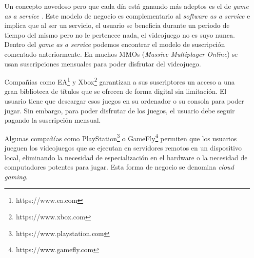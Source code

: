 Un concepto novedoso pero que cada día está ganando más adeptos es el de \textit{game as a service} \cite{11}. Este modelo de negocio es complementario al \textit{software as a service} e implica que al ser un servicio, el usuario se beneficia durante un periodo de tiempo del mismo pero no le pertenece nada, el videojuego no es suyo nunca. Dentro del \textit{game as a service} podemos encontrar el modelo de suscripción comentado anteriormente. En muchos MMOs (\textit{Massive Multiplayer Online}) se usan suscripciones mensuales para poder disfrutar del videojuego.

Compañías como EA\footnote{https://www.ea.com} y Xbox\footnote{https://www.xbox.com} garantizan a sus suscriptores un acceso a una gran biblioteca de títulos que se ofrecen de forma digital sin limitación. El usuario tiene que descargar esos juegos en su ordenador o su consola para poder jugar. Sin embargo, para poder disfrutar de los juegos, el usuario debe seguir pagando la suscripción mensual.

Algunas compañías como PlayStation\footnote{https://www.playstation.com} o GameFly\footnote{https://www.gamefly.com} permiten que los usuarios jueguen los videojuegos que se ejecutan en servidores remotos en un dispositivo local, eliminando la necesidad de especialización en el hardware o la necesidad de computadores potentes para jugar. Esta forma de negocio se denomina \textit{cloud gaming}.












